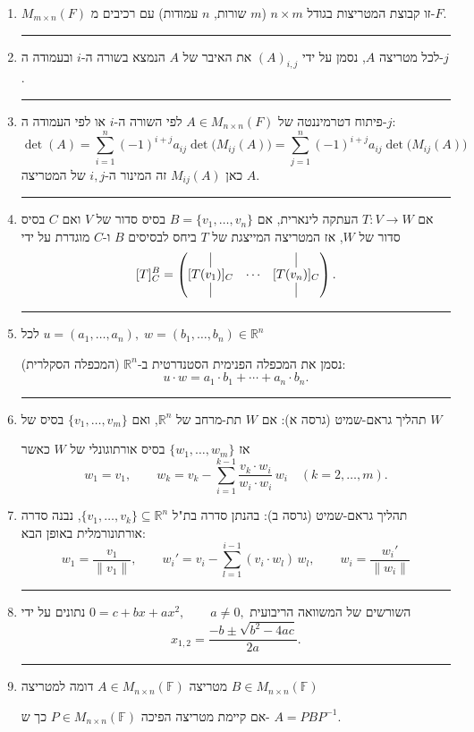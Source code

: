 \documentclass[12pt, a4paper]{article}
\newcommand{\ff}{\mathbb{F}}
\newcommand{\rr}{\mathbb{R}}
\begin{document}
\begin{enumerate}
\item $M_{m\times n}(F)$ זו קבוצת המטריצות בגודל $n\times m$
($m$ שורות, $n$ עמודות)
עם רכיבים מ-$F$.

\noindent\rule{\textwidth-30pt}{0.4pt}

\item לכל מטריצה $A$, נסמן על ידי $(A)_{i,j}$ את האיבר של $A$ הנמצא בשורה ה-$i$ ובעמודה ה-$j$.

\noindent\rule{\textwidth-30pt}{0.4pt}

\item פיתוח דטרמיננטה של $A\in M_{n\times n}(F)$ לפי השורה ה-$i$ או לפי העמודה ה-$j$:
\[
\det(A)=\sum_{i=1}^{n}(-1)^{i+j}a_{ij}\det\!\big(M_{ij}(A)\big)
=\sum_{j=1}^{n}(-1)^{i+j}a_{ij}\det\!\big(M_{ij}(A)\big)
\]
כאן $M_{ij}(A)$ זה המינור ה-$i,j$ של המטריצה $A$.

\noindent\rule{\textwidth-30pt}{0.4pt}

\item אם $T:V\to W$ העתקה לינארית, אם $B=\{v_1,\ldots,v_n\}$ בסיס סדור של $V$ ואם $C$ בסיס סדור של $W$,
אז המטריצה המייצגת של $T$ ביחס לבסיסים $B$ ו-$C$ מוגדרת על ידי
\[
[T]^B_C=
\begin{pmatrix}
\vline & & \vline\\
[T(v_1)]_C & \cdots & [T(v_n)]_C\\
\vline & & \vline
\end{pmatrix}.
\]

\noindent\rule{\textwidth-30pt}{0.4pt}

\item לכל $u=(a_1,\ldots,a_n),\; w=(b_1,\ldots,b_n)\in\mathbb{R}^n$

נסמן את המכפלה הפנימית הסטנדרטית ב-$\mathbb{R}^n$ (המכפלה הסקלרית):
\[
 u\cdot w=a_1\cdot b_1+\cdots+a_n\cdot b_n.
\]

\noindent\rule{\textwidth-30pt}{0.4pt}



\item תהליך גראם-שמיט (גרסה א):
אם $W$ תת-מרחב של $\rr^n$, ואם $\{v_1,\ldots,v_m\}$ בסיס של $W$

אז $\{w_1,\ldots,w_m\}$ בסיס אורתוגונלי של $W$ כאשר
\[
w_1=v_1,\qquad
w_k=v_k-\sum_{i=1}^{k-1}\frac{ v_k\cdot w_i}{ w_i\cdot w_i}\,w_i
\quad (k=2,\ldots,m).
\]
\item תהליך גראם-שמיט (גרסה ב):
בהנתן סדרה בת"ל
$\{v_1,\ldots,v_k\}\subseteq \rr^n$, נבנה סדרה אורתונורמלית באופן הבא:
\[
w_1=\frac{v_1}{\|v_1\|},\qquad
w_i'=v_i-\sum_{l=1}^{i-1} (v_i\cdot w_l)\,w_l,\qquad w_i = \frac{w_i'}{\|w_i\|}
\]

\noindent\rule{\textwidth-30pt}{0.4pt}

\item השורשים של המשוואה הריבועית
$
0=c+bx+ax^2,\qquad a\ne 0,
$
נתונים על ידי
\[
x_{1,2}=\frac{-b\pm\sqrt{b^2-4ac}}{2a}.
\]

\noindent\rule{\textwidth-30pt}{0.4pt}

\item מטריצה $A\in M_{n\times n}(\ff)$ דומה למטריצה $B\in M_{n\times n}(\ff)$ 

אם
קיימת 
מטריצה הפיכה
$P\in M_{n\times n}(\ff)$ כך ש-
$A=PBP^{-1}$.
\end{enumerate}
\end{document}

